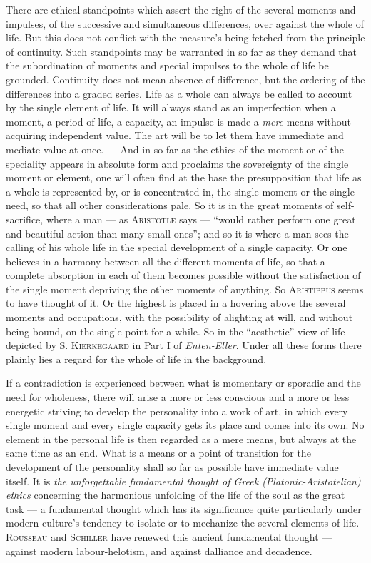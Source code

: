 \documentclass[12pt,a4paper]{book}
\newcommand{\opage}[1]{\marginnote{\footnotesize\textit{[#1]}}}
\begin{document}
There are ethical standpoints which assert the right of the several moments and
impulses, of the successive and simultaneous differences, over against the whole
of life. But this does not conflict with the measure's being fetched from the
principle of continuity. Such standpoints may be warranted in so far as they
demand that \opage{73}the subordination of moments and special impulses to the whole of
life be grounded. Continuity does not mean absence of difference, but the
ordering of the differences into a graded series. Life as a whole can always be
called to account by the single element of life. It will always stand as an
imperfection when a moment, a period of life, a capacity, an impulse is made a
\emph{mere} means without acquiring independent value. The art will be to let
them have immediate and mediate value at once. --- And in so far as the ethics of
the moment or of the speciality appears in absolute form and proclaims the
sovereignty of the single moment or element, one will often find at the base the
presupposition that life as a whole is represented by, or is concentrated in, the
single moment or the single need, so that all other considerations pale. So it is
in the great moments of self-sacrifice, where a man --- as \textsc{Aristotle}
says --- ``would rather perform one great and beautiful action than many small
ones''; and so it is where a man sees the calling of his whole life in the
special development of a single capacity. Or one believes in a harmony between
all the different moments of life, so that a complete absorption in each of them
becomes possible without the satisfaction of the single moment depriving the
other moments of anything. So \textsc{Aristippus} seems to have thought of it. Or
the highest is placed in a hovering above the several moments and occupations,
with the possibility of alighting at will, and without being bound, on the single
point for a while. So in the ``aesthetic'' view of life depicted by
\textsc{S. Kierkegaard} in Part I of \textit{Enten-Eller}. Under all these forms
there plainly lies a regard for the whole of life in the background.

If a contradiction is experienced between what is momentary or sporadic and the
need for wholeness, there will arise a more or less conscious and a more or less
energetic striving to develop the personality into a work of art, in which every
single moment and every single capacity gets its place and comes into its own. No
element in the personal life is then regarded as a mere means, but always at the
same time as an end. What is a means or a point of transition for the development
of the personality shall so far as possible have immediate value itself. It is
\emph{the unforgettable fundamental thought of Greek (Platonic-Aristotelian)
ethics} concerning the harmonious \opage{74}unfolding of the life of the soul as the great
task --- a fundamental thought which has its significance quite particularly
under modern culture's tendency to isolate or to mechanize the several elements
of life. \textsc{Rousseau} and \textsc{Schiller} have renewed this ancient
fundamental thought --- against modern labour-helotism, and against dalliance and
decadence.
\end{document}
